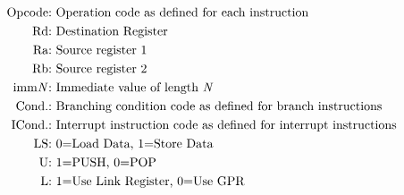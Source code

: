\hspace{0pt}\\\\

\begingroup
\setlength{\abovedisplayskip}{0pt}
 \\
\begin{alignat*}{2}
	\text{Opcode:}& \text{ Operation code as defined for each instruction} \\
	\text{Rd:}& \text{ Destination Register} \\
	\text{Ra:}& \text{ Source register 1} \\
	\text{Rb:}& \text{ Source register 2} \\
	\text{imm\textit{N}:}& \text{ Immediate value of length \textit{N}} \\
	\text{Cond.:}& \text{ Branching condition code as defined for branch instructions} \\
	\text{ICond.:}& \text{ Interrupt instruction code as defined for interrupt instructions} \\
	\text{LS:}& \text{ 0=Load Data, 1=Store Data} \\
	\text{U:}& \text{ 1=PUSH, 0=POP} \\
	\text{L:}& \text{ 1=Use Link Register, 0=Use GPR} \\
\end{alignat*}
\endgroup

\newpage
{}
\begin{table}[h]
\centering
\footnotesize
{}
\end{table}\\

